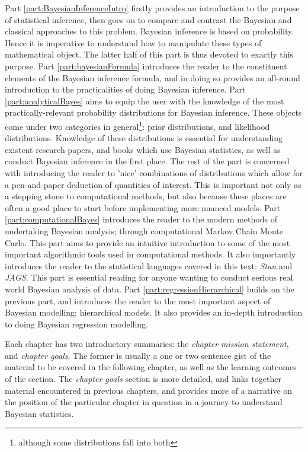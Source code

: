 \documentclass[11pt,fullpage]{book}
\begin{document}
Part \ref{part:BayesianInferenceIntro} firstly provides an introduction to the purpose of statistical inference, then goes on to compare and contrast the Bayesian and classical approaches to this problem. Bayesian inference is based on probability. Hence it is imperative to understand how to manipulate these types of mathematical object. The latter half of this part is thus devoted to exactly this purpose. Part \ref{part:bayesianFormula} introduces the reader to the constituent elements of the Bayesian inference formula, and in doing so provides an all-round introduction to the practicalities of doing Bayesian inference. Part \ref{part:analyticalBayes} aims to equip the user with the knowledge of the most practically-relevant probability distributions for Bayesian inference. These objects come under two categories in general\footnote{although some distributions fall into both}: prior distributions, and likelihood distributions. Knowledge of these distributions is essential for understanding existent research papers, and books which use Bayesian statistics, as well as conduct Bayesian inference in the first place. The rest of the part is concerned with introducing the reader to 'nice' combinations of distributions which allow for a pen-and-paper deduction of quantities of interest. This is important not only as a stepping stone to computational methods, but also because these places are often a good place to start before implementing more nuanced models. Part \ref{part:computationalBayes} introduces the reader to the modern methods of undertaking Bayesian analysis; through computational Markov Chain Monte Carlo. This part aims to provide an intuitive introduction to some of the most important algorithmic tools used in computational methods. It also importantly introduces the reader to the statistical languages covered in this text: \textit{Stan} and \textit{JAGS}. This part is essential reading for anyone wanting to conduct serious real world Bayesian analysis of data. Part \ref{part:regressionHierarchical} builds on the previous part, and introduces the reader to the most important aspect of Bayesian modelling; hierarchical models. It also provides an in-depth introduction to doing Bayesian regression modelling.

Each chapter has two introductory summaries: the \textit{chapter mission statement}, and \textit{chapter goals}. The former is usually a one or two sentence gist of the material to be covered in the following chapter, as well as the learning outcomes of the section. The \textit{chapter goals} section is more detailed, and links together material encountered in previous chapters, and provides more of a narrative on the position of the particular chapter in question in a journey to understand Bayesian statistics. 
\end{document}
